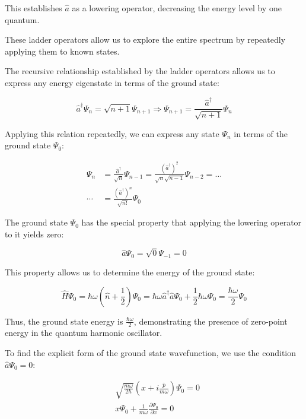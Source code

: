 \documentclass[italian]{HKNdocument}
\begin{document}
This establishes $\hat{a}$ as a lowering operator, decreasing the energy level by one quantum.

These ladder operators allow us to explore the entire spectrum by repeatedly applying them to known states.


The recursive relationship established by the ladder operators allows us to express any energy eigenstate in terms of the ground state:

\begin{equation}
\hat{a}^\dagger\Psi_n = \sqrt{n+1}\Psi_{n+1} \Longrightarrow \Psi_{n+1} = \frac{\hat{a}^\dagger}{\sqrt{n+1}}\Psi_n
\end{equation}

Applying this relation repeatedly, we can express any state $\Psi_n$ in terms of the ground state $\Psi_0$:

\begin{align}
\Psi_n &= \frac{\hat{a}^\dagger}{\sqrt{n}}\Psi_{n-1} = \frac{(\hat{a}^\dagger)^2}{\sqrt{n}\sqrt{n-1}}\Psi_{n-2} = \ldots  \\
\cdots &= \frac{(\hat{a}^\dagger)^n}{\sqrt{n!}}\Psi_0
\end{align}

The ground state $\Psi_0$ has the special property that applying the lowering operator to it yields zero:

\begin{equation}
\hat{a}\Psi_0 = \sqrt{0}\Psi_{-1} = 0
\end{equation}

This property allows us to determine the energy of the ground state:

\begin{equation}
\hat{H}\Psi_0 = \hbar\omega\left(\hat{n}+\frac{1}{2}\right)\Psi_0 = \hbar\omega\hat{a}^\dagger\hat{a}\Psi_0 + \frac{1}{2}\hbar\omega\Psi_0 = \frac{\hbar\omega}{2}\Psi_0
\end{equation}

Thus, the ground state energy is $\frac{\hbar\omega}{2}$, demonstrating the presence of zero-point energy in the quantum harmonic oscillator.

To find the explicit form of the ground state wavefunction, we use the condition $\hat{a}\Psi_0 = 0$:

\begin{align}
&\sqrt{\frac{m\omega}{2\hbar}}\left(x + i\frac{\hat{p}}{m\omega}\right)\Psi_0 = 0  \\
&x\Psi_0 + \frac{1}{m\omega}\frac{\partial\Psi_0}{\partial x} = 0
\end{align}
\end{document}
